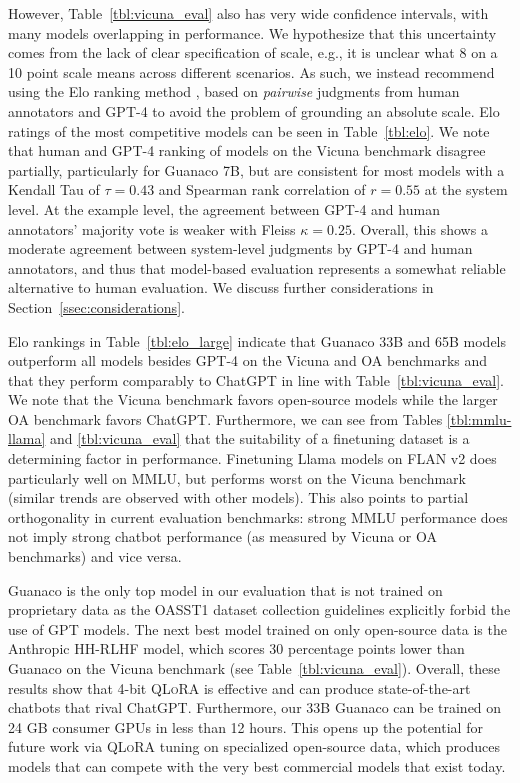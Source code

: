 \documentclass{article}
\newcommand{\method}{\textsc{QLoRA}\xspace}
\newcommand{\model}{{Guanaco}\xspace}
\begin{document}
However, Table~\ref{tbl:vicuna_eval} also has very wide confidence intervals, with many models overlapping in performance. We hypothesize that this uncertainty comes from the lack of clear specification of scale, e.g., it is unclear what 8 on a 10 point scale means across different scenarios. As such, we instead recommend using the Elo ranking method \citep{elo1967proposed}, based on \textit{pairwise} judgments from human annotators and GPT-4 to avoid the problem of grounding an absolute scale.
Elo ratings of the most competitive models can be seen in Table~\ref{tbl:elo}. We note that human and GPT-4 ranking of models on the Vicuna benchmark disagree partially, particularly for Guanaco 7B, but are consistent for most models with a Kendall Tau of $\tau=0.43$ and Spearman rank correlation of $r=0.55$ at the system level. At the example level, the agreement between GPT-4 and human annotators' majority vote is weaker with Fleiss $\kappa=0.25$. Overall, this shows a moderate agreement between system-level judgments by GPT-4 and human annotators, and thus that model-based evaluation represents a somewhat reliable alternative to human evaluation. We discuss further considerations in Section~\ref{ssec:considerations}.

Elo rankings in Table~\ref{tbl:elo_large} indicate that \model 33B and 65B models outperform all models besides GPT-4 on the Vicuna and OA benchmarks and that they perform comparably to ChatGPT in line with Table~\ref{tbl:vicuna_eval}. We note that the Vicuna benchmark favors open-source models while the larger OA benchmark favors ChatGPT.
Furthermore, we can see from Tables \ref{tbl:mmlu-llama} and \ref{tbl:vicuna_eval} that the suitability of a finetuning dataset is a determining factor in performance. Finetuning Llama models on FLAN v2 does particularly well on MMLU, but performs worst on the Vicuna benchmark (similar trends are observed with other models). This also points to partial orthogonality in current evaluation benchmarks: strong MMLU performance does not imply strong chatbot performance (as measured by Vicuna or OA benchmarks) and vice versa.

\model is the only top model in our evaluation that is not trained on proprietary data as the OASST1 dataset collection guidelines explicitly forbid the use of GPT models. The next best model trained on only open-source data is the Anthropic HH-RLHF model, which scores 30 percentage points lower than \model on the Vicuna benchmark (see Table~\ref{tbl:vicuna_eval}). Overall, these results show that 4-bit \method is effective and can produce state-of-the-art chatbots that rival ChatGPT. Furthermore, our 33B \model can be trained on 24 GB consumer GPUs in less than 12 hours. This opens up the potential for future work via \method tuning on specialized open-source data, which produces models that can compete with the very best commercial models that exist today. 
\end{document}
